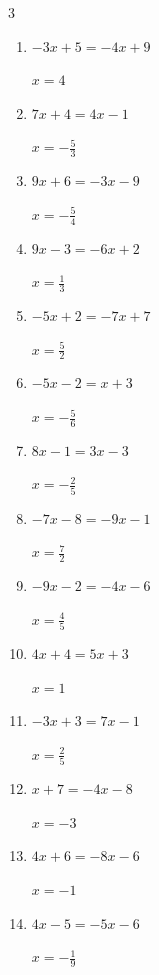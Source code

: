 \begin{multicols}{3}
\begin{enumerate}
        $\displaystyle x=-\frac{1}{7}$

  \item $-3x+5=-4x+9$

        $\displaystyle x=4$

  \item $7x+4=4x-1$

        $\displaystyle x=-\frac{5}{3}$

  \item $9x+6=-3x-9$

        $\displaystyle x=-\frac{5}{4}$

  \item $9x-3=-6x+2$

        $\displaystyle x=\frac{1}{3}$

\columnbreak %

  \item $-5x+2=-7x+7$

        $\displaystyle x=\frac{5}{2}$

  \item $-5x-2=x+3$

        $\displaystyle x=-\frac{5}{6}$

  \item $8x-1=3x-3$

        $\displaystyle x=-\frac{2}{5}$

  \item $-7x-8=-9x-1$

        $\displaystyle x=\frac{7}{2}$

  \item $-9x-2=-4x-6$

        $\displaystyle x=\frac{4}{5}$

  \item $4x+4=5x+3$

        $\displaystyle x=1$

  \item $-3x+3=7x-1$

        $\displaystyle x=\frac{2}{5}$

  \item $x+7=-4x-8$

        $\displaystyle x=-3$

  \item $4x+6=-8x-6$

        $\displaystyle x=-1$

  \item $4x-5=-5x-6$

        $\displaystyle x=-\frac{1}{9}$


\end{enumerate}
\end{multicols}
